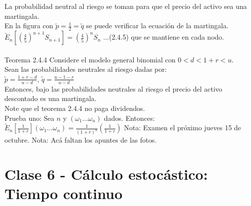 \documentclass{article}
\begin{document}
        \\
        \\
        La probabilidad neutral al riesgo se toman para que el precio del activo sea una martingala.
        \\
        En la figura con $\tilde{p} = \frac{1}{2} = \tilde{q}$ se puede verificar la ecuación de la martingala.
        \\
        $\tilde{E}_n[(\frac{4}{5})^{n+1} S_{n+1}] = (\frac{4}{5})^n S_n$ ...(2.4.5)
        que se mantiene en cada nodo.
        \\
        \\
        Teorema 2.4.4 Considere el modelo general binomial con $0 < d < 1+r < u$.
        \\
        Sean las probabilidades neutrales al riesgo dadas por:
        \\
        $\tilde{p} = \frac{1 + r-d}{u-d}$, $\tilde{q} = \frac{u - 1 - r}{u-d}$
        \\
        Entonces, bajo las probabilidades neutrales al riesgo el precio del activo descontado es una martingala.
        \\
        Note que el teorema 2.4.4 no paga dividendos.
        \\
        Prueba uno: Sea $n$ y $(\omega_1 ... \omega_n)$ dados. Entonces:
        \\
        $\tilde{E}_n[\frac{1}{1+r}] (\omega_1 ... \omega_n) = \frac{1}{(1+r)^n} (\frac{1}{1+r})$
        Nota: Examen el próximo jueves 15 de octubre.
        Nota: Acá faltan los apuntes de las fotos.
        \section{Clase 6 - Cálculo estocástico: Tiempo continuo}
\end{document}
